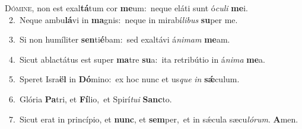 \lettrine{\initial\textcolor{\initialcolor}{D}}{ómine,} non est exal\-\textbf{tá}\-tum cor \textbf{me}\-um:~\star neque eláti sunt ó\-\textit{cu}\-\textit{li} \textbf{me}\-i.\\
{\numbfont\textcolor{\numbcolor}{~2.}}~Neque ambu\-\textbf{lá}\-vi in \textbf{ma}\-gnis:~\star neque in mirabí\-\textit{li}\-\textit{bus} \textbf{su}\-per me.\par
{\numbfont\textcolor{\numbcolor}{~3.}}~Si non humíliter \textbf{sen}\-ti\-\textbf{é}\-bam:~\star sed exaltávi á\-\textit{ni}\-\textit{mam} \textbf{me}\-am.\par
{\numbfont\textcolor{\numbcolor}{~4.}}~Sicut ablactátus est super \textbf{ma}\-tre \textbf{su}\-a:~\star ita retribútio in á\-\textit{ni}\-\textit{ma} \textbf{me}\-a.\par
{\numbfont\textcolor{\numbcolor}{~5.}}~Speret Isra\textbf{ël} in \textbf{Dó}\-mino:~\star ex hoc nunc et us\textit{que} \textit{in} \textbf{sǽ}\-culum.\par
{\numbfont\textcolor{\numbcolor}{~6.}}~Glória \textbf{Pa}\-tri, et \textbf{Fí}\-lio,~\star et Spirí\-\textit{tu}\-\textit{i} \textbf{Sanc}\-to.\par
{\numbfont\textcolor{\numbcolor}{~7.}}~Sicut erat in princípio, et \textbf{nunc}\-, et \textbf{sem}\-per,~\star et in sǽcula sæcu\-\textit{ló}\-\textit{rum}. \textbf{A}\-men.\par
